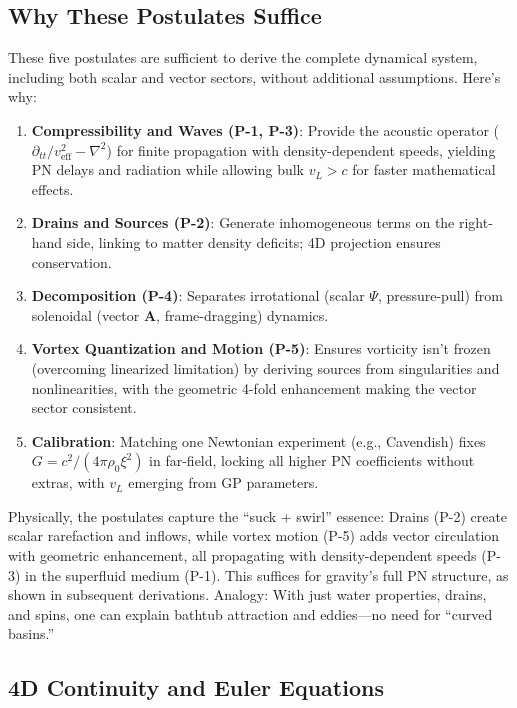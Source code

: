 \subsection{Why These Postulates Suffice}

These five postulates are sufficient to derive the complete dynamical system, including both scalar and vector sectors, without additional assumptions. Here's why:

\begin{enumerate}
    \item \textbf{Compressibility and Waves (P-1, P-3)}: Provide the acoustic operator ($\partial_{tt}/v_{\text{eff}}^2 - \nabla^2$) for finite propagation with density-dependent speeds, yielding PN delays and radiation while allowing bulk $v_L > c$ for faster mathematical effects.
    \item \textbf{Drains and Sources (P-2)}: Generate inhomogeneous terms on the right-hand side, linking to matter density deficits; 4D projection ensures conservation.
    \item \textbf{Decomposition (P-4)}: Separates irrotational (scalar $\Psi$, pressure-pull) from solenoidal (vector $\mathbf{A}$, frame-dragging) dynamics.
    \item \textbf{Vortex Quantization and Motion (P-5)}: Ensures vorticity isn't frozen (overcoming linearized limitation) by deriving sources from singularities and nonlinearities, with the geometric 4-fold enhancement making the vector sector consistent.
    \item \textbf{Calibration}: Matching one Newtonian experiment (e.g., Cavendish) fixes $G = c^2 / (4\pi \rho_0 \xi^2)$ in far-field, locking all higher PN coefficients without extras, with $v_L$ emerging from GP parameters.
\end{enumerate}

Physically, the postulates capture the ``suck + swirl'' essence: Drains (P-2) create scalar rarefaction and inflows, while vortex motion (P-5) adds vector circulation with geometric enhancement, all propagating with density-dependent speeds (P-3) in the superfluid medium (P-1). This suffices for gravity's full PN structure, as shown in subsequent derivations. Analogy: With just water properties, drains, and spins, one can explain bathtub attraction and eddies---no need for ``curved basins.''

\subsection{4D Continuity and Euler Equations}

